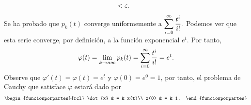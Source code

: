 \documentclass[../template.tex]{subfiles}
\begin{document}
\begin{demostracion}
\begin{align*}
                &< \varepsilon.
            \end{align*}
        Se ha probado que $p_k(t)$ converge uniformemente a $\displaystyle \sum_{i=0}^{\infty} \frac{t^i}{i!}$. Podemos ver que esta serie converge, por definición, a la función exponencial $e^t$. Por tanto,
            \begin{align*}
                \varphi(t) = \lim_{k \rightarrow a \infty} p_k(t) =  \sum_{i=0}^{\infty} \frac{t^i}{i!} = e^t.
            \end{align*}
        Observe que $\varphi '(t) = \varphi(t) = e^t$ y $\varphi (0) = e^0 = 1$, por tanto, el problema de Cauchy que satisface $\varphi$ estará dado por
            \begin{align*}
                \begin{funcionporpartes}{rcl}
                    \dot{x} & = & x(t)\\
                    x(0) & = & 1.
                \end{funcionporpartes}
            \end{align*}
            
    \end{demostracion}
\end{document}
